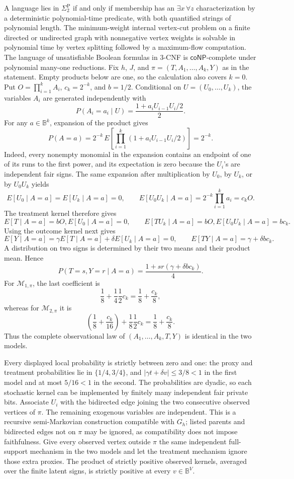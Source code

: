 A language lies in \(\Sigma _2^{\mathrm P}\) if and only if membership has an \(\exists x\,\forall z\) characterization by a deterministic polynomial-time predicate, with both quantified strings of polynomial length.
The minimum-weight internal vertex-cut problem on a finite directed or undirected graph with nonnegative vertex weights is solvable in polynomial time by vertex splitting followed by a maximum-flow computation.
The language of unsatisfiable Boolean formulas in \(3\)-CNF is \(\mathsf{coNP}\)-complete under polynomial many-one reductions.
Fix \(h\), \(J\), and \(\pi=(T,A_1,\ldots,A_k,Y)\) as in the statement.  Empty products below are one, so the calculation also covers \(k=0\).  Put \(O=\prod_{i=1}^k A_i\), \(c_k=2^{-k}\), and \(b=1/2\).  Conditional on \(U=(U_0,\ldots,U_k)\), the variables \(A_i\) are generated independently with
\[
 P(A_i=a_i\mid U)=\frac{1+a_iU_{i-1}U_i/2}{2}.
\]
For any \(a\in\mathbb B^k\), expansion of the product gives
\[
 P(A=a)=2^{-k}\,E\!\left[\prod_{i=1}^k(1+a_iU_{i-1}U_i/2)\right]=2^{-k}.
\]
Indeed, every nonempty monomial in the expansion contains an endpoint of one of its runs to the first power, and its expectation is zero because the \(U_i\)'s are independent fair signs.  The same expansion after multiplication by \(U_0\), by \(U_k\), or by \(U_0U_k\) yields
\[
 E[U_0\mid A=a]=E[U_k\mid A=a]=0,
 \qquad
 E[U_0U_k\mid A=a]=2^{-k}\prod_{i=1}^k a_i=c_kO.
\]
The treatment kernel therefore gives
\[
 E[T\mid A=a]=bO,E[U_0\mid A=a]=0,
 \qquad
 E[TU_k\mid A=a]=bO,E[U_0U_k\mid A=a]=bc_k.
\]
Using the outcome kernel next gives
\[
 E[Y\mid A=a]=\gamma E[T\mid A=a]+\delta E[U_k\mid A=a]=0,
 \qquad
 E[TY\mid A=a]=\gamma+\delta bc_k.
\]
A distribution on two signs is determined by their two means and their product mean.  Hence
\[
 P(T=s,Y=r\mid A=a)=\frac{1+sr(\gamma+\delta bc_k)}{4}.
\]
For \(\mathcal M_{1,\pi}\), the last coefficient is
\[
 \frac18+\frac14\frac12c_k=\frac18+\frac{c_k}{8},
\]
whereas for \(\mathcal M_{2,\pi}\) it is
\[
 \left(\frac18+\frac{c_k}{16}\right)+\frac18\frac12c_k
 =\frac18+\frac{c_k}{8}.
\]
Thus the complete observational law of \((A_1,\ldots,A_k,T,Y)\) is identical in the two models.

Every displayed local probability is strictly between zero and one: the proxy and treatment probabilities lie in \(\{1/4,3/4\}\), and \(|\gamma t+\delta v|\le3/8<1\) in the first model and at most \(5/16<1\) in the second.  The probabilities are dyadic, so each stochastic kernel can be implemented by finitely many independent fair private bits.  Associate \(U_i\) with the bidirected edge joining the two consecutive observed vertices of \(\pi\).  The remaining exogenous variables are independent.  This is a recursive semi-Markovian construction compatible with \(G_h\); listed parents and bidirected edges not on \(\pi\) may be ignored, as compatibility does not impose faithfulness.  Give every observed vertex outside \(\pi\) the same independent full-support mechanism in the two models and let the treatment mechanism ignore those extra proxies.  The product of strictly positive observed kernels, averaged over the finite latent signs, is strictly positive at every \(v\in\mathbb B^V\).

